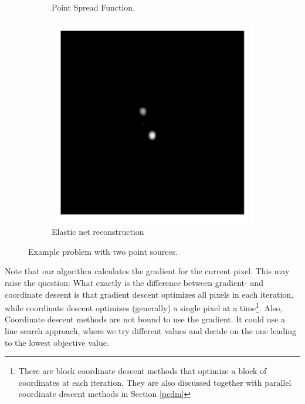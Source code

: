 \begin{figure}[h]
\begin{subfigure}[b]{0.3\linewidth}
		\caption{Point Spread Function.}
		\label{cd:serial:aid:psf}
	\end{subfigure}
	\begin{subfigure}[b]{0.3\linewidth}
		\includegraphics[width=\linewidth, clip, trim= 0.25in 0.25in 0.25in 0.25in]{./chapters/03.cd/simulated/elasticNet.png}
		\caption{Elastic net reconstruction}
		\label{cd:serial:aid:elastic}
	\end{subfigure}

	\caption{Example problem with two point sources.}
	\label{cd:serial:aid:figure}
\end{figure}

Note that our algorithm calculates the gradient for the current pixel. This may raise the question: What exactly is the difference between gradient- and coordinate descent is that gradient descent optimizes all pixels in each iteration, while coordinate descent optimizes (generally) a single pixel at a time\footnote{There are block coordinate descent methods that optimize a block of coordinates at each iteration. They are also discussed together with parallel coordinate descent methods in Section \ref{pcdm}}. Also, Coordinate descent methods are not bound to use the gradient. It could use a line search approach, where we try different values and decide on the one leading to the lowest objective value.

